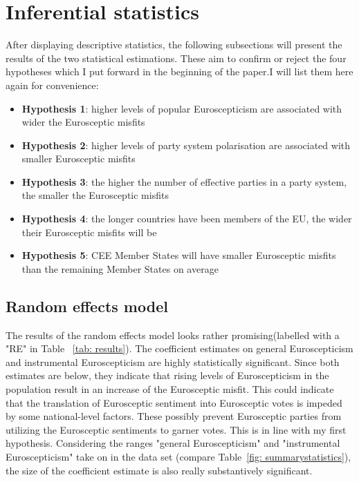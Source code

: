 

\section{Inferential statistics}
After displaying descriptive statistics, the following subsections will present the results of the two statistical estimations. These aim to confirm or reject the four hypotheses which I put forward in the beginning of the paper.I will list them here again for convenience:
\begin{itemize}
	\item {\bf Hypothesis 1}: higher levels of popular Euroscepticism are associated with wider the Eurosceptic misfits
	\item {\bf Hypothesis 2}: higher levels of party system polarisation are associated with smaller Eurosceptic misfits
	\item {\bf Hypothesis 3}: the higher the number of effective parties in a party system, the smaller the Eurosceptic misfits
	\item {\bf Hypothesis 4}: the longer countries have been members of the EU, the wider their Eurosceptic misfits will be
	\item {\bf Hypothesis 5}: CEE Member States will have smaller Eurosceptic misfits than the remaining Member States on average
\end{itemize}

\subsection{Random effects model}
The results of the random effects model looks rather promising(labelled with a "RE" in Table ~\ref{tab: results}). The coefficient estimates on general Euroscepticism and instrumental Euroscepticism are highly statistically significant. 
Since both estimates are below, they indicate that rising levels of Euroscepticism in the population result in an increase of the Eurosceptic misfit. This could indicate that the translation of Eurosceptic sentiment into Eurosceptic votes is impeded by some national-level factors. These possibly prevent Eurosceptic parties from utilizing the Eurosceptic sentiments to garner votes. This is in line with my first hypothesis. Considering the ranges "general Euroscepticism" and "instrumental Euroscepticism" take on in the data set (compare Table~\ref{fig: summarystatistics}), the size of the coefficient estimate is also really substantively significant. 

